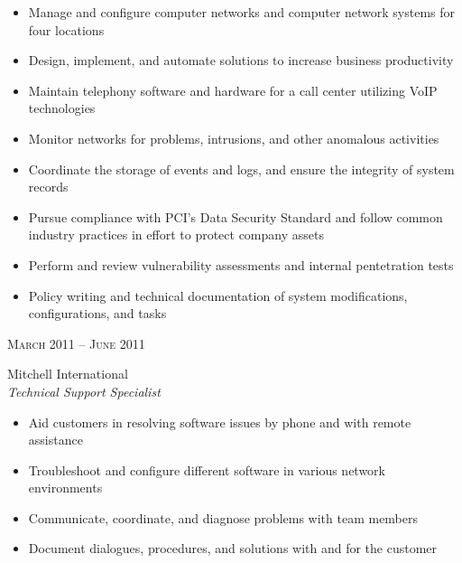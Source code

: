 \documentclass[10pt]{article} %
\begin{document}
{\begin{minipage}[t]{0.5\textwidth}
\begin{itemize}
\item Manage and configure computer networks and computer network systems for four locations
\item Design, implement, and automate solutions to increase business productivity
\item Maintain telephony software and hardware for a call center utilizing VoIP technologies
\item Monitor networks for problems, intrusions, and other anomalous activities
\item Coordinate the storage of events and logs, and ensure the integrity of system records
\item Pursue compliance with PCI's Data Security Standard and follow common industry practices in effort to protect company assets
\item Perform and review vulnerability assessments and internal pentetration tests
\item Policy writing and technical documentation of system modifications, configurations, and tasks
\end{itemize}


{\raggedleft\textsc{March 2011 -- June 2011}\par}

{\raggedright\large Mitchell International\\
\textit{Technical Support Specialist}\\[5pt]}

\begin{itemize}
\item Aid customers in resolving software issues by phone and with remote assistance
\item Troubleshoot and configure different software in various network environments
\item Communicate, coordinate, and diagnose problems with team members
\item Document dialogues, procedures, and solutions with and for the customer
\end{itemize}



\end{minipage}}
\end{document}
